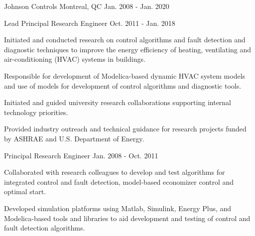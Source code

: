 

\begin{cventries}

\cvmultientry
{Johnson Controls} %
{Montreal, QC}
{Jan. 2008 - Jan. 2020} %
{
\cvsubentry
{Lead Principal Research Engineer} %
{} %
{Oct. 2011 - Jan. 2018} %
{
\begin{cvitems} %
\item {Initiated and conducted research on control algorithms and fault detection and diagnostic techniques to improve the energy efficiency of heating, ventilating and air-conditioning (HVAC) systems in buildings.}
\item {Responsible for development of Modelica-based dynamic HVAC system models and use of models for development of control algorithms and diagnostic tools.}
\item {Initiated and guided university research collaborations supporting internal technology priorities.}
\item {Provided industry outreach and technical guidance for research projects funded by ASHRAE and U.S. Department of Energy.}
\end{cvitems}
}
\cvsubentry
{Principal Research Engineer} %
{} %
{Jan. 2008 - Oct. 2011} %
{
\begin{cvitems} %
\item {Collaborated with research colleagues to develop and test algorithms for integrated control and fault detection, model-based economizer control and optimal start.}
\item {Developed simulation platforms using Matlab, Simulink, Energy Plus, and Modelica-based tools and libraries to aid development and testing of control and fault detection algorithms.}
\end{cvitems}
}
}

\end{cventries}
